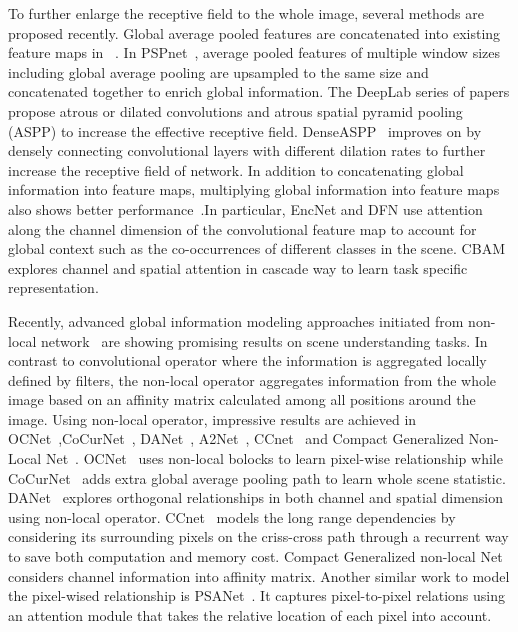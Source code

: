 \documentclass{bmvc2k}
\begin{document}
To further enlarge the receptive field to the whole image, several methods are proposed recently. Global average pooled features are concatenated into existing feature maps in ~\cite{parsenet}. In PSPnet~\cite{pspnet}, average pooled features of multiple window sizes including global average pooling are upsampled to the same size and concatenated together to enrich global information. The DeepLab series of papers \cite{deeplabv1, deeplabv2, deeplabv3} propose atrous or dilated convolutions and atrous spatial pyramid pooling (ASPP) to increase the effective receptive field. DenseASPP~\cite{denseaspp} improves on \cite{deeplabv2} by densely connecting convolutional layers with different dilation rates to further increase the receptive field of network. In addition to concatenating global information into feature maps, multiplying global information into feature maps also shows better performance~\cite{encodingnet, cbam, cgnl, dfn}.In particular, EncNet \cite{encodingnet} and DFN \cite{dfn} use attention along the channel dimension of the convolutional feature map to account for global context such as the co-occurrences of different classes in the scene. CBAM\cite{cbam} explores channel and spatial attention in cascade way to learn task specific representation. 


Recently, advanced global information modeling approaches initiated from non-local network~\cite{Nonlocal} are showing promising results on scene understanding tasks. In contrast to convolutional operator where the information is aggregated locally defined by filters, the non-local operator aggregates information from the whole image based on an affinity matrix calculated among all positions around the image. Using non-local operator, impressive results are achieved in OCNet~\cite{ocnet},CoCurNet~\cite{CoCurrentNet}, DANet~\cite{DAnet}, A2Net~\cite{a2net}, CCnet~\cite{ccnet} and Compact Generalized Non-Local Net~\cite{cgnl}. OCNet~\cite{ocnet} uses non-local bolocks to learn pixel-wise relationship while CoCurNet~\cite{CoCurrentNet} adds extra global average pooling path to learn whole scene statistic. DANet~\cite{DAnet} explores orthogonal relationships in both channel and spatial dimension using non-local operator. CCnet~\cite{ccnet} models the long range dependencies by considering its surrounding pixels on the criss-cross path through a recurrent way to save both computation and memory cost. Compact Generalized non-local Net~\cite{cgnl} considers channel information into affinity matrix. Another similar work to model the pixel-wised relationship is PSANet~\cite{psanet}. It captures pixel-to-pixel relations using an attention module that takes the relative location of each pixel into account. 
\end{document}
